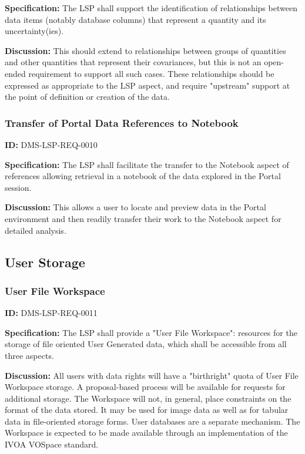 \documentclass[SE,toc]{lsstdoc}
\begin{document}
\textbf{Specification:}
The LSP shall support the identification of relationships between data items (notably database columns) that represent a quantity and its uncertainty(ies).

\textbf{Discussion:}
This should extend to relationships between groups of quantities and other quantities that represent their covariances, but this is not an open-ended requirement to support all such cases.
These relationships should be expressed as appropriate to the LSP aspect, and require "upstream" support at the point of definition or creation of the data.

\subsubsection{Transfer of Portal Data References to Notebook}

\label{DMS-LSP-REQ-0010}
\textbf{ID:} DMS-LSP-REQ-0010

\textbf{Specification:}
The LSP shall facilitate the transfer to the Notebook aspect of references allowing retrieval in a notebook of the data explored in the Portal session.

\textbf{Discussion:}
This allows a user to locate and preview data in the Portal environment and then readily transfer their work to the Notebook aspect for detailed analysis.

\subsection{User Storage}

\subsubsection{User File Workspace}

\label{DMS-LSP-REQ-0011}
\textbf{ID:} DMS-LSP-REQ-0011

\textbf{Specification:}
The LSP shall provide a "User File Workspace": resources for the storage of file oriented User Generated data, which shall be accessible from all three aspects.

\textbf{Discussion:}
All users with data rights will have a "birthright" quota of User File Workspace storage.  A proposal-based process will be available for requests for additional storage.  The Workspace will not, in general, place constraints on the format of the data stored.  It may be used for image data as well as for tabular data in file-oriented storage forms.  User databases are a separate mechanism.
The Workspace is expected to be made available through an implementation of the IVOA VOSpace standard.
\end{document}
